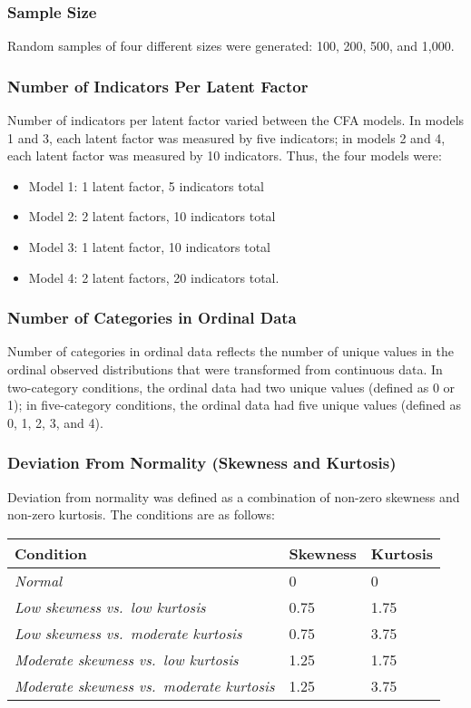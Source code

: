 \documentclass[10,a4paperpaper,]{article}
\begin{document}
\subsubsection{Sample Size}

Random samples of four different sizes were generated: 100, 200, 500,
and 1,000.

\subsubsection{Number of Indicators Per Latent Factor}

Number of indicators per latent factor varied between the CFA models. In
models 1 and 3, each latent factor was measured by five indicators; in
models 2 and 4, each latent factor was measured by 10 indicators. Thus,
the four models were:

\begin{itemize}
\tightlist
\item
  Model 1: 1 latent factor, 5 indicators total
\item
  Model 2: 2 latent factors, 10 indicators total
\item
  Model 3: 1 latent factor, 10 indicators total
\item
  Model 4: 2 latent factors, 20 indicators total.
\end{itemize}

\subsubsection{Number of Categories in Ordinal Data}

Number of categories in ordinal data reflects the number of unique
values in the ordinal observed distributions that were transformed from
continuous data. In two-category conditions, the ordinal data had two
unique values (defined as 0 or 1); in five-category conditions, the
ordinal data had five unique values (defined as 0, 1, 2, 3, and 4).

\subsubsection{Deviation From Normality (Skewness and Kurtosis)}

Deviation from normality was defined as a combination of non-zero
skewness and non-zero kurtosis. The conditions are as follows:

\begin{longtable}[]{@{}lll@{}}
\toprule
Condition & Skewness & Kurtosis \\
\midrule
\endhead
\emph{Normal} & 0 & 0 \\
\emph{Low skewness vs.~low kurtosis} & 0.75 & 1.75 \\
\emph{Low skewness vs.~moderate kurtosis} & 0.75 & 3.75 \\
\emph{Moderate skewness vs.~low kurtosis} & 1.25 & 1.75 \\
\emph{Moderate skewness vs.~moderate kurtosis} & 1.25 & 3.75 \\
\bottomrule
\end{longtable}
\end{document}

